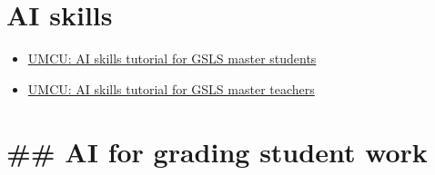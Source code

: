 \documentclass[
  letterpaper,
  DIV=11,
  numbers=noendperiod]{scrreprt}
\providecommand{\tightlist}{%
  \setlength{\itemsep}{0pt}\setlength{\parskip}{0pt}}\usepackage{longtable,booktabs,array}
\begin{document}
\section{AI skills}\label{ai-skills-1}

\begin{itemize}
\tightlist
\item
  \href{https://ulearning.uu.nl/enrol/index.php?id=1462}{UMCU: AI skills
  tutorial for GSLS master students}
\item
  \href{https://ulearning.uu.nl/enrol/index.php?id=1598}{UMCU: AI skills
  tutorial for GSLS master teachers}
\end{itemize}

\section{\#\# AI for grading student
work}\label{ai-for-grading-student-work}
\end{document}
